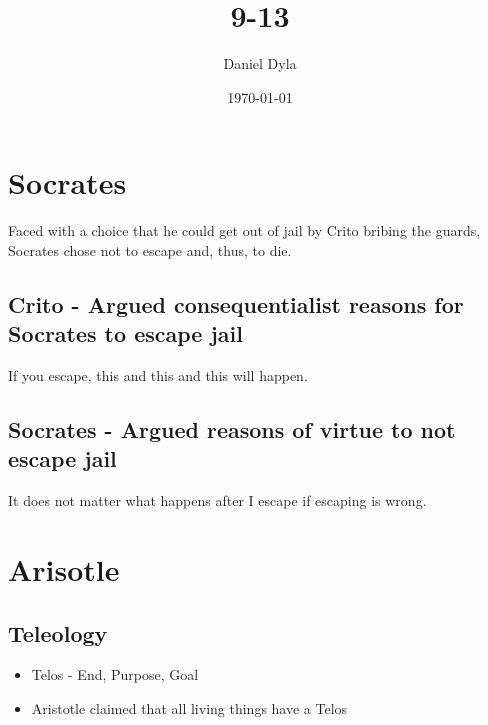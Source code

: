 \documentclass[11pt]{article}
\author{Daniel Dyla}
\date{\today}
\title{9-13}
\begin{document}
\maketitle
\tableofcontents

\section{Socrates}
\label{sec-1}

Faced with a choice that he could get out of jail by Crito bribing the
guards, Socrates chose not to escape and, thus, to die.

\subsection{Crito - Argued consequentialist reasons for Socrates to escape jail}
\label{sec-1-1}

If you escape, this and this and this will happen.

\subsection{Socrates - Argued reasons of virtue to not escape jail}
\label{sec-1-2}

It does not matter what happens after I escape if escaping is wrong.

\section{Arisotle}
\label{sec-2}

\subsection{Teleology}
\label{sec-2-1}

\begin{itemize}
\item Telos - End, Purpose, Goal
\item Aristotle claimed that all living things have a Telos
\end{itemize}
\end{document}
